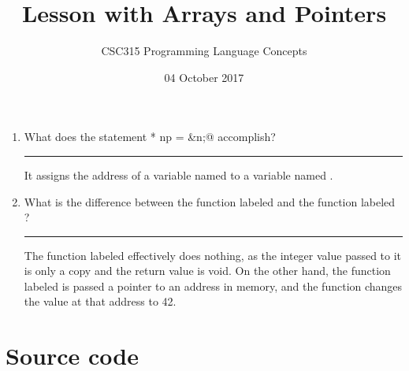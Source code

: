 \documentclass[twoside]{article}
\title{Lesson with Arrays and Pointers}
\author{CSC315 Programming Language Concepts}
\date{04 October 2017}
\newenvironment{answer}
  { \vspace*{12pt}

    \rule{12cm}{0.02cm}

    \vspace*{12pt}

    \hspace*{1.0cm}
    \begin{minipage}{10cm}}
  {\end{minipage} \vspace*{12pt}}
\begin{document}
\maketitle

\begin{enumerate}
  \item What does the statement \lstinline@int* np = &n;@ accomplish?

  \begin{answer}
    It assigns the address of a variable named \lstinline@n@ to 
    a variable named \lstinline@np@.
    \end{answer}

  \item What is the difference between the function labeled \lstinline@f@ 
  and the function labeled \lstinline@g@?

  \begin{answer}
    The function labeled \lstinline@f@ effectively does nothing, as the 
    integer value passed to it is only a copy and the return value is void. 
    On the other hand, the function labeled \lstinline@g@ is passed a pointer 
    to an address in memory, and the function changes the value at that address 
    to 42.
    \end{answer}

  \end{enumerate}


\section{Source code}
\end{document}
